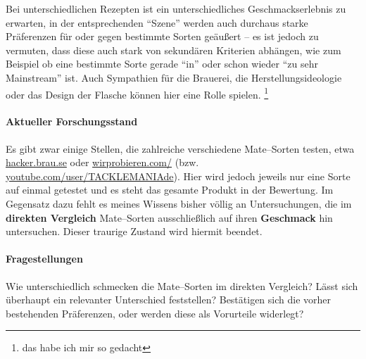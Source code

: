 \documentclass[11pt,a4paper,ngerman]{article}
\begin{document}
Bei unterschiedlichen Rezepten ist ein unterschiedliches Geschmackserlebnis zu erwarten, in der entsprechenden "`Szene"' werden auch durchaus starke Präferenzen für oder gegen bestimmte Sorten geäußert -- es ist jedoch zu vermuten, dass diese auch stark von sekundären Kriterien abhängen, wie zum Beispiel ob eine bestimmte Sorte gerade "`in"' oder schon wieder "`zu sehr Mainstream"' ist.  Auch Sympathien für die Brauerei, die Herstellungsideologie oder das Design der Flasche können hier eine Rolle spielen. \footnote{das habe ich mir so gedacht}

\paragraph{Aktueller Forschungsstand}
Es gibt zwar einige Stellen, die zahlreiche verschiedene Mate--Sorten testen, etwa \href{http://hacker.brau.se/}{hacker.brau.se} oder \href{http://wirprobieren.com/}{wirprobieren.com/} (bzw. \href{https://www.youtube.com/user/TACKLEMANIAde}{youtube.com/user/TACKLEMANIAde}). Hier wird jedoch jeweils nur eine Sorte auf einmal getestet und es steht das gesamte Produkt in der Bewertung. Im Gegensatz dazu fehlt es meines Wissens bisher völlig an Untersuchungen, die im \textbf{direkten Vergleich} Mate--Sorten ausschließlich auf ihren \textbf{Geschmack} hin untersuchen. Dieser traurige Zustand wird hiermit beendet.

\paragraph{Fragestellungen}
Wie unterschiedlich schmecken die Mate--Sorten im direkten Vergleich? Lässt sich überhaupt ein relevanter Unterschied feststellen? Bestätigen sich die vorher bestehenden Präferenzen, oder werden diese als Vorurteile widerlegt?



\end{document}
